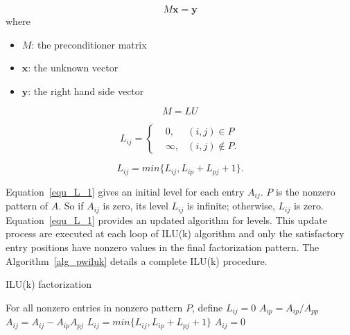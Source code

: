 \documentclass[runningheads,a4paper]{llncs}
\newcommand{\vect}[1]{\boldsymbol{#1}}
\begin{document}
{\begin{equation}
\label{equ_pc}
M\vect{x} = \vect{y}
\end{equation}
where
\begin{itemize}\itemsep1pt \parskip0pt 
  \item $M$: the preconditioner matrix
  \item $\vect{x}$: the unknown vector
  \item $\vect{y}$: the right hand side vector
\end{itemize}

\begin{equation}
\label{equ_lu}
M = LU
\end{equation}


\begin{equation}
\label{equ_L_1}
L_{ij} = \left\{
 \begin{aligned}
 & 0, & (i, j) \in P \\
 & \infty, & (i, j) \notin P.
 \end{aligned}
  \right.
\end{equation}

\begin{equation}
\label{equ_L_2}
L_{ij} = min \{L_{ij}, L_{ip} + L_{pj} + 1\}.
\end{equation}

Equation~\ref{equ_L_1} gives an initial level for each entry $A_{ij}$. $P$ is the nonzero pattern of $A$. So if $A_{ij}$ is zero, its level $L_{ij}$ is infinite; otherwise, $L_{ij}$ is zero. Equation~\eqref{equ_L_1} provides an updated algorithm for levels. This update process are executed at each loop of ILU(k) algorithm and only the satisfactory entry positions have nonzero values in the final factorization pattern. The Algorithm~\ref{alg_pwiluk} details a complete ILU(k) procedure.

\begin{algorithm}[!htb]
\caption{ILU(k) factorization} \label{alg_pwiluk}
\begin{algorithmic}[1]
\State For all nonzero entries in nonzero pattern $P$, define $L_{ij} = 0$
   \State $A_{ip} = A_{ip} / A_{pp}$
     \State $A_{ij} = A_{ij} - A_{ip}A_{pj}$
     \State $L_{ij} = min \{L_{ij}, L_{ip} + L_{pj} + 1\}$
     \EndFor
  \EndFor
     \State $A_{ij} = 0$
  \EndIf
\EndFor
\end{algorithmic}
\end{algorithm}

}
\end{document}
